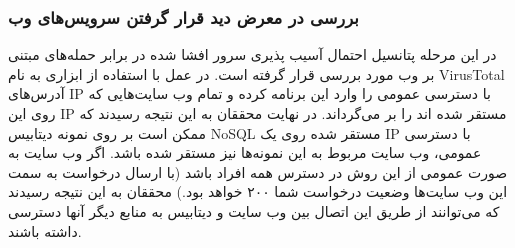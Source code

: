 \documentclass[10pt, a4paper]{article}
\begin{document}
\subsubsection*{بررسی در معرض دید قرار گرفتن سرویس‌های وب}


در این مرحله پتانسیل احتمال آسیب پذیری سرور افشا شده در برابر حمله‌های مبتنی بر
وب مورد بررسی قرار گرفته است. در عمل با استفاده از ابزاری به نام VirusTotal
آدرس‌های IP با دسترسی عمومی را وارد این برنامه کرده و تمام وب سایت‌هایی که روی
این IP مستقر شده اند را بر می‌گرداند. در نهایت محققان به این نتیجه رسیدند که
ممکن است بر روی نمونه دیتابیس NoSQL مستقر شده روی یک IP با دسترسی عمومی، وب
سایت‌ مربوط به این نمونه‌ها نیز مستقر شده باشد. اگر وب سایت به صورت عمومی از این
روش در دسترس همه افراد باشد (با ارسال درخواست به سمت این وب سایت‌ها وضعیت
درخواست شما ۲۰۰ خواهد بود.) محققان به این نتیجه رسیدند که می‌توانند از طریق این
اتصال بین وب سایت و دیتابیس به منابع دیگر آنها دسترسی داشته باشند.
\end{document}
